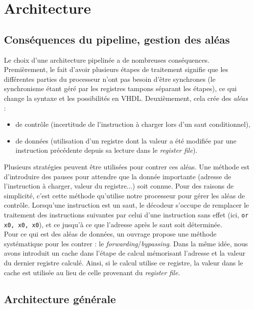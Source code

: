 \chapter{Architecture}
\label{ch:architecure}

\section{Conséquences du pipeline, gestion des aléas}
\label{sec:pipeline}

Le choix d'une architecture pipelinée\cite{pipeline} a de nombreuses
conséquences. Premièrement, le fait d'avoir plusieurs étapes de traitement
signifie que les différentes parties du processeur n'ont pas besoin d'être
synchrones (le synchronisme étant géré par les registres tampons séparant les
étapes), ce qui change la syntaxe et les possibilités en VHDL. Deuxièmement,
cela crée des \textit{aléas} :
\begin{itemize}
\item de contrôle (incertitude de l'instruction à charger lors d'un saut
    conditionnel),
\item de données (utilisation d'un registre dont la valeur a été modifiée par
    une instruction précédente depuis sa lecture dans le
    \textit{register file}). \\
\end{itemize}

Plusieurs stratégies peuvent être utilisées pour contrer ces aléas. Une méthode
est d'introduire des pauses pour attendre que la donnée importante (adresse de
l'instruction à charger, valeur du registre...) soit connue. Pour des raisons de
simplicité, c'est cette méthode qu'utilise notre processeur pour gérer les aléas
de contrôle. Lorsqu'une instruction est un saut, le décodeur s'occupe de
remplacer le traitement des instructions suivantes par celui d'une instruction
sans effet (ici, \texttt{or x0, x0, x0}), et ce jusqu'à ce que l'adresse après
le saut soit déterminée. \\

Pour ce qui est des aléas de données, un ouvrage\cite{riscv} propose une méthode
systématique pour les contrer : le \textit{forwarding}/\textit{bypassing}. Dans
la même idée, nous avons introduit un cache dans l'étape de calcul mémorisant
l'adresse et la valeur du dernier registre calculé. Ainsi, si le calcul utilise
ce registre, la valeur dans le cache est utilisée au lieu de celle provenant du
\textit{register file}.

\section{Architecture générale}

